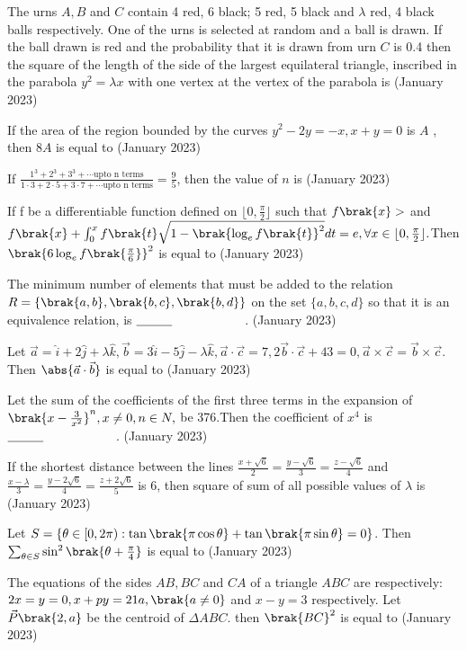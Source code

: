 \iffalse
\title{01-24-2023-shift-2-16-30}
\author{AI24BTECH11011}
\section{mains}
\fi
    \item The urns $A, B$ and $C$ contain 4 red, 6 black; 5 red, 5 black and $\lambda$ red, 4 black balls respectively. One of the urns is selected at random and a ball is drawn. If the ball drawn is red and the probability that it is drawn from urn $C$ is 0.4 then the square of the length of the side of the largest equilateral triangle, inscribed in the parabola $y^2 = \lambda x$ with one vertex at the vertex of the parabola is
\hfill{(January 2023)}
\item If the area of the region bounded by the curves $y^2-2y=-x,x+y=0$ is $A$ , then $8A$ is equal to
\hfill{(January 2023)}
\item If $\frac{1^3+2^3+3^3+\cdots \text{upto n terms}}{1\cdot 3+2\cdot 5+3 \cdot 7+\cdots\text{upto n terms}}=\frac{9}{5}$, then the value of $n$ is
    \hfill{(January 2023)}
    \item If f be a differentiable function defined on $\lfloor 0,\frac{\pi}{2} \rfloor $ such that $f\brak{x}>$ and $f\brak{x}+\int_{0}^{x}f\brak{t}\sqrt{1-\brak{\log_ef\brak{t}}^2}dt=e,\forall x \in \lfloor 0,\frac{\pi}{2} \rfloor.$Then $\brak{6\log_ef\brak{\frac{\pi}{6}}}^2$ is equal to
    \hfill{(January 2023)}
    \item The minimum number of elements that must be added to the relation $R = \{\brak{a, b}, \brak{b, c}, \brak{b, d}\}$ on the set $\{a, b, c, d\}$ so that it is an equivalence relation, is $\makebox[3cm][l]{\underline{\hspace{1cm}}}$.
    \hfill{(January 2023)}
    \item Let $\vec{a}=\hat{i}+2\hat{j}+\lambda\hat{k},\vec{b}=3\hat{i}-5\hat{j}-\lambda\hat{k},\vec{a}\cdot\vec{c}=7,2\vec{b}\cdot\vec{c}+43=0,\vec{a}\times\vec{c}=\vec{b}\times\vec{c}.$ Then $\abs{\vec{a}\cdot\vec{b}}$ is equal to
    \hfill{(January 2023)}
    \item Let the sum of the coefficients of the first three terms in the expansion of $\brak{x-\frac{3}{x^2}}^n,x\neq 0,n \in N,$ be 376.Then the coefficient of $x^4$ is $\makebox[3cm][l]{\underline{\hspace{1cm}}}$.
    \hfill{(January 2023)}
    \item If the shortest distance between the lines $\frac{x
    +\sqrt{6}}{2}=\frac{y-\sqrt{6}}{3}=\frac{z-\sqrt{6}}{4}$ and $\frac{x-\lambda}{3}=\frac{y-2\sqrt{6}}{4}=\frac{z+2\sqrt{6}}{5}$ is 6, then square of sum of all possible values of $\lambda$ is 
    \hfill{(January 2023)}
    \item Let $S=\{\theta \in [0,2\pi):\tan\brak{\pi\cos\theta}+\tan\brak{\pi\sin\theta}=0\}$. Then $\sum_{\theta \in S}\sin^2\brak{\theta+\frac{\pi}{4}}$ is equal to
    \hfill{(January 2023)}
    \item The equations of the sides $AB,BC$ and $CA$ of a triangle $ABC $ are respectively: $2x=y=0,x+py=21a,\brak{a\neq 0}$ and $x-y=3$ respectively. Let $\vec{P}\brak{2,a}$ be the centroid of $\Delta ABC$. then $\brak{BC}^2$ is equal to
\hfill{(January 2023)}

